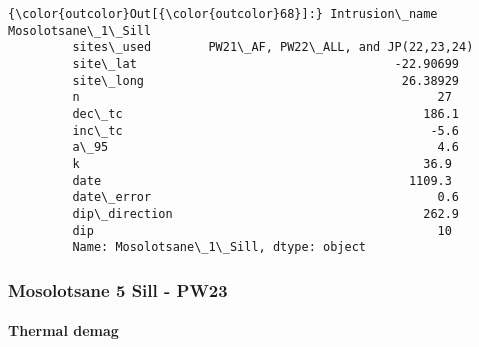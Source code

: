 \documentclass{article}
\begin{document}
            \begin{Verbatim}[commandchars=\\\{\}]
{\color{outcolor}Out[{\color{outcolor}68}]:} Intrusion\_name                     Mosolotsane\_1\_Sill
         sites\_used        PW21\_AF, PW22\_ALL, and JP(22,23,24)
         site\_lat                                    -22.90699
         site\_long                                    26.38929
         n                                                  27
         dec\_tc                                          186.1
         inc\_tc                                           -5.6
         a\_95                                              4.6
         k                                                36.9
         date                                           1109.3
         date\_error                                        0.6
         dip\_direction                                   262.9
         dip                                                10
         Name: Mosolotsane\_1\_Sill, dtype: object
\end{Verbatim}
        
    \subsubsection{Mosolotsane 5 Sill -
PW23}\label{mosolotsane-5-sill---pw23}

    \paragraph{Thermal demag}\label{thermal-demag}
\end{document}
